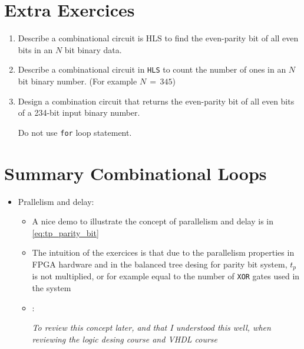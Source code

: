 \newpage
\section{Extra Exercices}

\begin{enumerate}

\item Describe a combinational circuit is HLS to find the even-parity bit of all even bits in an $N$ bit binary data.

\item Describe a combinational circuit in \verb|HLS| to count the number of ones in an $N$ bit binary number. (For example $N\, = \, 345$)

\item Design a combination circuit that returns the even-parity bit of all even bits of a 234-bit input binary number. 

Do not use \verb|for| loop statement. 

\end{enumerate}





\newpage
\section{Summary Combinational Loops}

\begin{itemize}

\item Prallelism and delay:

	\begin{itemize}
	\item A nice demo to illustrate the concept of parallelism and delay is in \ref{eq:tp_parity_bit}
	
	\item The intuition of the exercices is that due to the parallelism properties in FPGA hardware and in the balanced tree desing for parity bit system, $t_p$ is not multiplied, or for example equal to the number of \verb|XOR| gates used in the system
	
	\item {} : 
	
	\textit{To review this concept later, and that I understood this well, when reviewing the logic desing course and VHDL course}
	
	
	\end{itemize}


\end{itemize}









